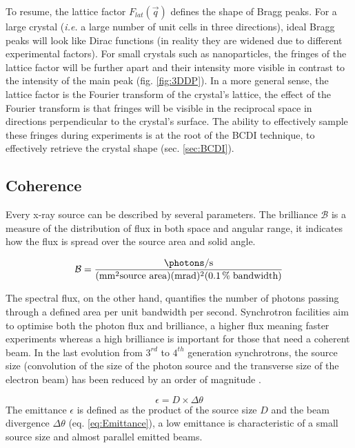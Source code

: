To resume, the lattice factor $F_{lat}(\vec{q})$ defines the shape of Bragg peaks.
For a large crystal (\textit{i.e.} a large number of unit cells in three directions), ideal Bragg peaks will look like Dirac functions (in reality they are widened due to different experimental factors).
For small crystals such as nanoparticles, the fringes of the lattice factor will be further apart and their intensity more visible in contrast to the intensity of the main peak (fig. \ref{fig:3DDP}).
In a more general sense, the lattice factor is the Fourier transform of the crystal's lattice, the effect of the Fourier transform is that fringes will be visible in the reciprocal space in directions perpendicular to the crystal's surface.
The ability to effectively sample these fringes during experiments is at the root of the BCDI technique, to effectively retrieve the crystal shape (sec. \ref{sec:BCDI}).

\subsection{Coherence} \label{sec:Coherence}

Every x-ray source can be described by several parameters.
The brilliance $\mathcal{B}$ is a measure of the distribution of flux in both space and angular range, it indicates how the flux is spread over the source area and solid angle.

\begin{equation}
    \mathcal{B} = \frac{\unit{\photons \per \second}}{(\unit{\mm^2} \text{source area})(\unit{\milli\radian})^2(\qty{0.1}{\percent} \; \text{bandwidth})}
\end{equation}

The spectral flux, on the other hand, quantifies the number of photons passing through a defined area per unit bandwidth per second.
Synchrotron facilities aim to optimise both the photon flux and brilliance, a higher flux meaning faster experiments whereas a high brilliance is important for those that need a coherent beam.
In the last evolution from $3^{rd}$ to $4^{th}$ generation synchrotrons, the source size (convolution of the size of the photon source and the transverse size of the electron beam) has been reduced by an order of magnitude \parencite{Willmott}.

\begin{equation}
    \label{eq:Emittance}
    \epsilon = D \times \Delta\theta
\end{equation}
The emittance $\epsilon$ is defined as the product of the source size $D$ and the beam divergence $\Delta\theta$ (eq. \ref{eq:Emittance}), a low emittance is characteristic of a small source size and almost parallel emitted beams.


